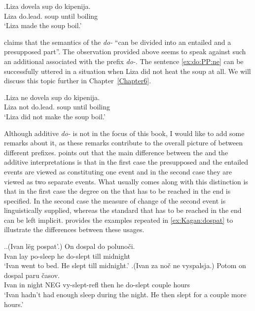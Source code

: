 \exg.\label{ex:do:PP}Liza dovela sup do kipenija.\\
Liza do.lead. soup until boiling\\
\trans `Liza made the soup boil.'

\citet[75]{Kagan:book} claims that the semantics of the  \textit{do-} ``can be divided into an entailed and a presupposed part''. The observation provided above seems to speak against such an additional  associated with the prefix \textit{do-}. The sentence \ref{ex:do:PP:ne} can be successfully uttered in a situation when Liza did not heat the soup at all. We will discuss this topic further in Chapter~\ref{Chapter6}.

\exg.\label{ex:do:PP:ne}Liza ne dovela sup do kipenija.\\
Liza not do.lead. soup until boiling\\
\trans `Liza did not make the soup boil.'

Although additive \textit{do-} is not in the focus of this book, I would like to add some remarks about it, as these remarks contribute to the overall picture of  between different prefixes. \citet[79]{Kagan:book} points out that the main difference between the  and the additive interpretations is that in the first case the presupposed and the entailed events are viewed as constituting one event and in the second case they are viewed as two separate events. What usually comes along with this distinction is that in the first case the degree on the  that has to be reached in the end is specified. In the second case the measure of change of the second event is linguistically supplied, whereas the  standard that has to be reached in the end can be left implicit. \citet[79]{Kagan:book} provides the examples repeated in \ref{ex:Kagan:dospat} to illustrate the differences between these usages.

\ex.\label{ex:Kagan:dospat}\ag.\label{ex:Kagan:dospat:1}(Ivan l\"{e}g pospat'.) On dospal do poluno\v{c}i.\\
Ivan lay po-sleep he do-slept till midnight\\
\trans `Ivan went to bed. He slept till midnight.'
\bg.\label{ex:Kagan:dospat:2}(Ivan za no\v{c} ne vyspalsja.) Potom on dospal paru \v{c}asov.\\
Ivan in night NEG vy-slept-refl then he do-slept couple hours\\
\trans `Ivan hadn't had enough sleep during the night. He then slept for a couple more hours.'


